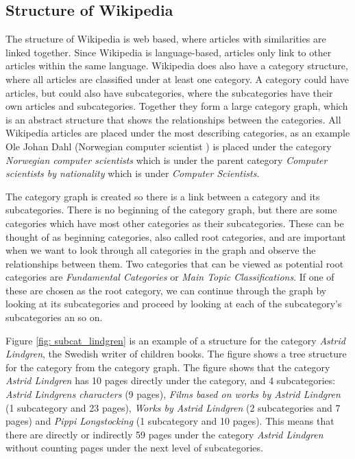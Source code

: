 \subsection{Structure of Wikipedia}
The structure of Wikipedia is web based, where articles with similarities are linked together. Since Wikipedia is language-based, articles only link to other articles within the same language. Wikipedia does also have a category structure, where all articles are classified under at least one category. A category could have articles, but could also have subcategories, where the subcategories have their own articles and subcategories. Together they form a large category graph, which is an abstract structure that shows the relationships between the categories. All Wikipedia articles are placed under the most describing categories, as an example Ole Johan Dahl (Norwegian computer scientist \cite{Olejohandahleng}) is placed under the category \emph{Norwegian computer scientists} which is under the parent category \emph{Computer scientists by nationality} which is under \emph{Computer Scientists}. 

The category graph is created so there is a link between a category and its subcategories. There is no beginning of the category graph, but there are some categories which have most other categories as their subcategories. These can be thought of as beginning categories, also called root categories, and are important when we want to look through all categories in the graph and observe the relationships between them.  Two categories that can be viewed as potential root categories are \emph{Fundamental Categories} or \emph{Main Topic Classifications}. If one of these are chosen as the root category, we can continue through the graph by looking at its subcategories and proceed by looking at each of the subcategory's subcategories an so on.

Figure \ref{fig: subcat_lindgren} is an example of a structure for the category \emph{Astrid Lindgren}, the Swedish writer of children books. The figure shows a tree structure for the category from the category graph. The figure shows that the category \emph{Astrid Lindgren} has 10 pages directly under the category, and 4 subcategories: \emph{Astrid Lindgrens characters} (9 pages), \emph{Films based on works by Astrid Lindgren} (1 subcategory and 23 pages), \emph{Works by Astrid Lindgren} (2 subcategories and 7 pages) and \emph{Pippi Longstocking} (1 subcategory and 10 pages).  This means that there are directly or indirectly 59 pages under the category \emph{Astrid Lindgren} without counting pages under the next level of subcategories. 


